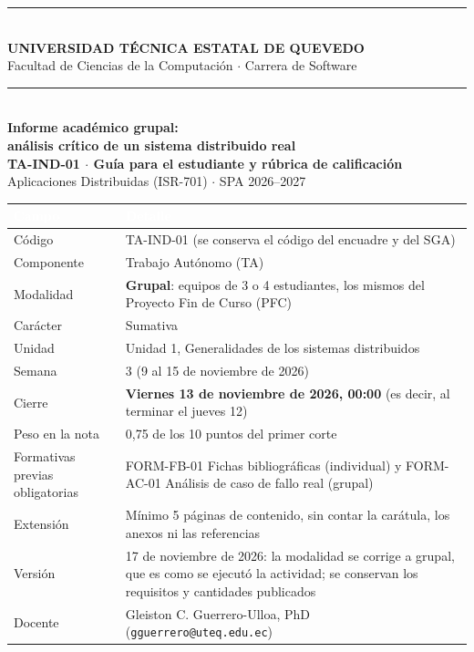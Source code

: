 \documentclass[11pt,a4paper]{article}
\newcommand{\hdr}[1]{\textcolor{white}{\textbf{#1}}}
\begin{document}
\begin{center}
	{\color{uteqBlue}\rule{\linewidth}{1pt}}\\[0.2cm]
	{\large\bfseries\color{uteqBlue} UNIVERSIDAD TÉCNICA ESTATAL DE QUEVEDO}\\[0.05cm]
	{\normalsize Facultad de Ciencias de la Computación $\cdot$ Carrera de Software}\\[0.1cm]
	{\color{uteqBlue}\rule{\linewidth}{1pt}}\\[0.35cm]
	{\LARGE\bfseries\color{uteqBlue} Informe académico grupal:}\\[0.1cm]
	{\LARGE\bfseries\color{uteqBlue} análisis crítico de un sistema distribuido real}\\[0.15cm]
	{\large\bfseries TA-IND-01 $\cdot$ Guía para el estudiante y rúbrica de calificación}\\[0.1cm]
	{\normalsize Aplicaciones Distribuidas (ISR-701) $\cdot$ SPA 2026--2027}
\end{center}

\vspace{0.2cm}

\begin{xltabular}{\linewidth}{@{}L{4.6cm}Y@{}}
	\toprule
	\hdr{Campo} & \hdr{Detalle} \\
	\midrule
	\endhead
	Código & TA-IND-01 (se conserva el código del encuadre y del SGA) \\
	Componente & Trabajo Autónomo (TA) \\
	Modalidad & \textbf{Grupal}: equipos de 3 o 4 estudiantes, los mismos del Proyecto Fin de Curso (PFC) \\
	Carácter & Sumativa \\
	Unidad & Unidad 1, Generalidades de los sistemas distribuidos \\
	Semana & 3 (9 al 15 de noviembre de 2026) \\
	Cierre & \textbf{Viernes 13 de noviembre de 2026, 00:00} (es decir, al terminar el jueves 12) \\
	Peso en la nota & 0,75 de los 10 puntos del primer corte \\
	Formativas previas obligatorias & FORM-FB-01 Fichas bibliográficas (individual) y FORM-AC-01 Análisis de caso de fallo real (grupal) \\
	Extensión & Mínimo 5 páginas de contenido, sin contar la carátula, los anexos ni las referencias \\
	Versión & 17 de noviembre de 2026: la modalidad se corrige a grupal, que es como se ejecutó la actividad; se conservan los requisitos y cantidades publicados \\
	Docente & Gleiston C. Guerrero-Ulloa, PhD (\texttt{gguerrero@uteq.edu.ec}) \\
	\bottomrule
\end{xltabular}
\end{document}
